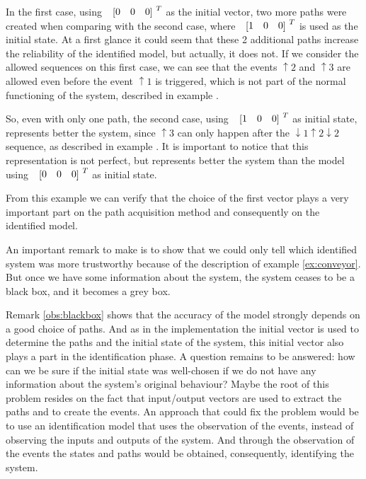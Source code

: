   In the first case, using $\colvec{0&0&0}^T$ as the initial vector, two more
  paths were created when comparing with the second case, where
  $\colvec{1&0&0}^T$ is used as the initial state. At a first glance it could
  seem that these 2 additional paths increase the reliability of the identified model,
  but actually, it does not. If we consider the allowed
  sequences on this first case, we can see that the events $\uparrow 2$ and
  $\uparrow 3$ are allowed even before the event $\uparrow 1$ is triggered,
  which is not part of the normal functioning of the system, described in
  example .

  So, even with only one path, the second case, using $\colvec{1&0&0}^T$ as
  initial state, represents better the system, since $\uparrow 3$ can only happen
  after the $\downarrow 1\uparrow 2\downarrow 2$ sequence, as described in
  example . It is important to notice that this
  representation is not perfect, but represents better the system than the model
  using $\colvec{0&0&0}^T$ as initial state.

  From this example we can verify that the choice of the first vector plays a very important part on
  the
  path acquisition method and consequently on the identified
  model.
  \begin{observation}
    \label{obs:blackbox}
  An important remark to make is to show that we could only tell
  which identified system was more trustworthy because of the description of
  example \ref{ex:conveyor}. But once we have some information about the system,
  the system ceases to be a black box, and it becomes a grey box. 
\end{observation}

Remark \ref{obs:blackbox} shows that the accuracy of the \DAOCT{} model strongly
depends on a good
choice of paths. And as in the implementation the initial vector is used to
determine the paths and the initial state of the
system, this initial vector also plays a part in the identification phase. A question remains to be answered: how can we be sure if the
initial state was well-chosen if we do not have any information about the system's original behaviour?
Maybe the root of this problem resides on the fact that input\slash output vectors
are used to extract the paths and to create the events. An approach that could
fix the problem would be to use an identification model that uses 
the observation of the events, instead of observing the inputs and
outputs of the system. And through the observation of the events the states and paths would be obtained, consequently, identifying the system.

